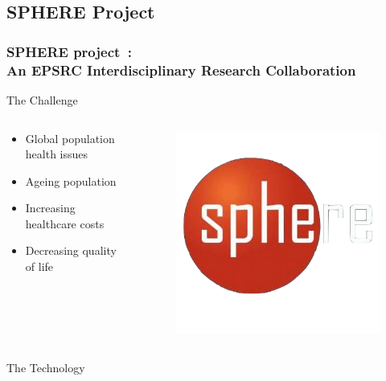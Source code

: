 \documentclass[09pt]{beamer}
\begin{document}
  \subsection{SPHERE Project}
  \begin{frame}[allowframebreaks]
    \frametitle{SPHERE project~\cite{sphere}:\\An EPSRC Interdisciplinary Research Collaboration} %
    \begin{block}{The Challenge}
      \begin{columns}
        \begin{column}{6cm}
          \begin{itemize}
            \item Global population health issues
            \item Ageing population
            \item Increasing healthcare costs
            \item Decreasing quality of life
          \end{itemize}
        \end{column}
        \begin{column}{4cm}
          \begin{figure}
            \includegraphics[scale=.13]{gfx/sphere} 
          \end{figure}
          \end{column}
      \end{columns}
    \end{block}
    \pause
    \begin{block}{The Technology}

\end{block}
\end{frame}
\end{document}
